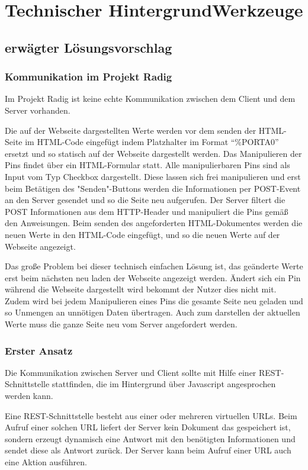 \chapter{Technischer HintergrundWerkzeuge}

\section{erwägter Lösungsvorschlag}

\subsection{Kommunikation im Projekt Radig}
Im Projekt Radig ist keine echte Kommunikation zwischen dem Client und dem Server 
vorhanden. 

Die auf der Webseite dargestellten Werte werden vor dem senden der HTML-Seite 
im HTML-Code eingefügt indem Platzhalter im Format "`\%PORTA0"' ersetzt und so statisch auf 
der Webseite dargestellt werden. Das Manipulieren der Pins findet über ein HTML-Formular 
statt. Alle manipulierbaren Pins sind als Input vom Typ Checkbox dargestellt. Diese lassen 
sich frei manipulieren und erst beim Betätigen des "Senden"-Buttons werden die 
Informationen per POST-Event an den Server gesendet und so die Seite neu aufgerufen. Der 
Server filtert die POST Informationen aus dem HTTP-Header und manipuliert die Pins gemäß 
den Anweisungen. Beim senden des angeforderten HTML-Dokumentes werden die neuen Werte in 
den HTML-Code eingefügt, und so die neuen Werte auf der Webseite angezeigt.

Das große Problem bei dieser technisch einfachen Lösung ist, das geänderte Werte erst beim 
nächsten neu laden der Webseite angezeigt werden. Ändert sich ein Pin während die Webseite 
dargestellt wird bekommt der Nutzer dies nicht mit. Zudem wird bei jedem Manipulieren 
eines Pins die gesamte Seite neu geladen und so Unmengen an unnötigen Daten übertragen. 
Auch zum darstellen der aktuellen Werte muss die ganze Seite neu vom Server angefordert 
werden.

\subsection{Erster Ansatz}
Die Kommunikation zwischen Server und Client sollte mit Hilfe einer REST-Schnittstelle 
stattfinden, die im Hintergrund über Javascript angesprochen werden kann. 

Eine REST-Schnittstelle besteht aus einer oder mehreren virtuellen URLs. Beim Aufruf einer 
solchen URL liefert der Server kein Dokument das gespeichert ist, sondern erzeugt 
dynamisch eine Antwort mit den benötigten Informationen und sendet diese als Antwort 
zurück. Der Server kann beim Aufruf einer URL auch eine Aktion ausführen.

